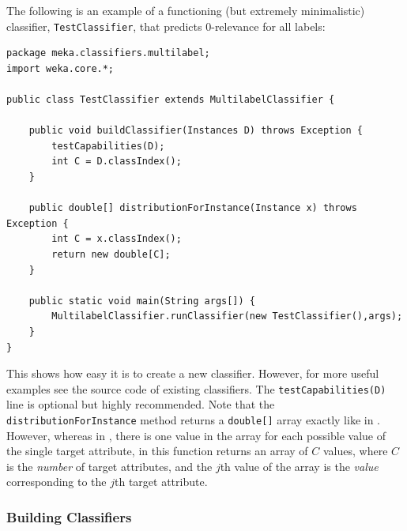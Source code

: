 \documentclass[11pt]{article}
\newcommand{\MEKA}{Meka}
\newcommand{\WEKA}{Weka}
\begin{document}
The following is an example of a functioning (but extremely minimalistic) classifier, \texttt{TestClassifier}, that predicts $0$-relevance for all labels:

{\small
\lstset{basicstyle=\small\ttfamily,breaklines=true,language=java,frame=L,xleftmargin=\parindent}
\begin{lstlisting}
package meka.classifiers.multilabel;
import weka.core.*;

public class TestClassifier extends MultilabelClassifier {
	
    public void buildClassifier(Instances D) throws Exception {
        testCapabilities(D);
        int C = D.classIndex();
    }
    
    public double[] distributionForInstance(Instance x) throws Exception {
        int C = x.classIndex();
       	return new double[C];
    }
    
    public static void main(String args[]) {
        MultilabelClassifier.runClassifier(new TestClassifier(),args);
    }
}
\end{lstlisting}
}

This shows how easy it is to create a new classifier. However, for more useful examples see the source code of existing \framework{\MEKA} classifiers. The \texttt{testCapabilities(D)} line is optional but highly recommended. Note that the \texttt{distributionForInstance} method returns a \texttt{double[]} array exactly like in \framework{\WEKA}. However, whereas in \framework{\WEKA}, there is one value in the array for each possible value of the single target attribute, in \framework{\MEKA} this function returns an array of $C$ values, where $C$ is the \emph{number} of target attributes, and the $j$th value of the array is the \emph{value} corresponding to the $j$th target attribute.

\subsubsection{Building Classifiers}
\end{document}
